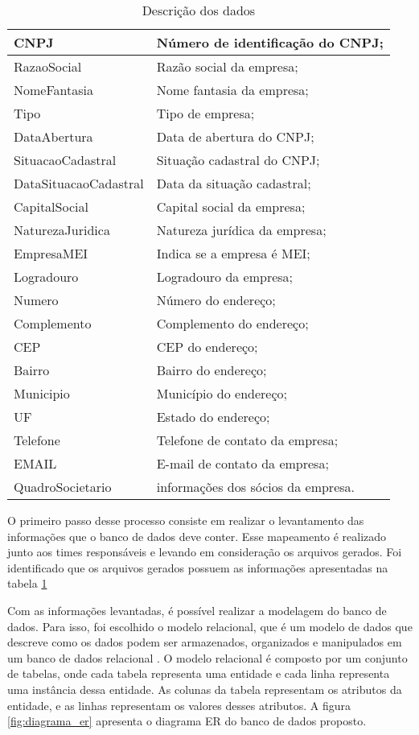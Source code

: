 \begin{table}[]
\centering
\begin{tabular}{|l|l|}
\hline
CNPJ & Número de identificação do CNPJ; \\ \hline
RazaoSocial & Razão social da empresa; \\ \hline
NomeFantasia & Nome fantasia da empresa; \\ \hline
Tipo & Tipo de empresa; \\ \hline
DataAbertura & Data de abertura do CNPJ; \\ \hline
SituacaoCadastral & Situação cadastral do CNPJ; \\ \hline
DataSituacaoCadastral & Data da situação cadastral; \\ \hline
CapitalSocial & Capital social da empresa; \\ \hline
NaturezaJuridica & Natureza jurídica da empresa; \\ \hline
EmpresaMEI & Indica se a empresa é MEI; \\ \hline
Logradouro & Logradouro da empresa; \\ \hline
Numero & Número do endereço; \\ \hline
Complemento & Complemento do endereço; \\ \hline
CEP & CEP do endereço; \\ \hline
Bairro & Bairro do endereço; \\ \hline
Municipio & Município do endereço; \\ \hline
UF & Estado do endereço; \\ \hline
Telefone & Telefone de contato da empresa; \\ \hline
EMAIL & E-mail de contato da empresa; \\ \hline
QuadroSocietario & informações dos sócios da empresa. \\ \hline
\end{tabular}
\caption{Descrição dos dados}
\label{tab:descricao_dados}
\end{table}

O primeiro passo desse processo consiste em realizar o levantamento das informações que o banco de dados deve conter. Esse mapeamento é realizado junto aos times responsáveis e levando em consideração os arquivos gerados. Foi identificado que os arquivos gerados possuem as informações apresentadas na tabela \ref{tab:descricao_dados}

Com as informações levantadas, é possível realizar a modelagem do banco de dados. Para isso, foi escolhido o modelo relacional, que é um modelo de dados que descreve como os dados podem ser armazenados, organizados e manipulados em um banco de dados relacional \cite{ramakrishnan2003database}. O modelo relacional é composto por um conjunto de tabelas, onde cada tabela representa uma entidade e cada linha representa uma instância dessa entidade. As colunas da tabela representam os atributos da entidade, e as linhas representam os valores desses atributos. A figura \ref{fig:diagrama_er} apresenta o diagrama ER do banco de dados proposto.

